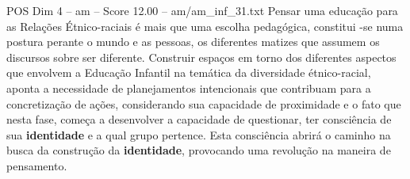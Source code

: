 \begin{textsample}{POS Dim 4 – am – Score 12.00 – am/am\_inf\_31.txt}
Pensar uma educação para as Relações Étnico-raciais é mais que uma escolha pedagógica, constitui -se numa postura perante o mundo e as pessoas, os diferentes matizes que assumem os discursos sobre ser diferente.
Construir espaços em torno dos diferentes aspectos que envolvem a Educação Infantil na temática da diversidade étnico-racial, aponta a necessidade de planejamentos intencionais que contribuam para a concretização de ações, considerando sua capacidade de proximidade e o fato que nesta fase, começa a desenvolver a capacidade de questionar, ter consciência de sua \textbf{identidade} e a qual grupo pertence.
Esta consciência abrirá o caminho na busca da construção da \textbf{identidade}, provocando uma revolução na maneira de pensamento.

\end{textsample}
